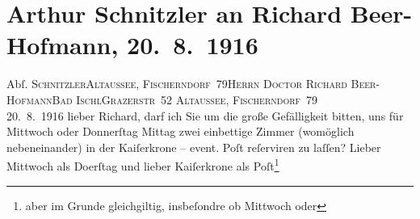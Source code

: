 

         
         \renewcommand{\erwaehntePersonen}{Personen: Richard Beer-Hofmann}
         \renewcommand{\erwaehnteOrte}{Orte: Altaussee, Aschau, Bad Aussee, Bad Ischl, Fischerndorf, Grazer Straße, Hoher Koppen, Hotel Kaiserkrone, Hotel Post, Pötschenpass, Restaurant Sonnenschein}
         \renewcommand{\erwaehnteWerke}{}
               \section[Arthur Schnitzler an Richard Beer-Hofmann, 20. 8. 1916]{ Arthur Schnitzler an Richard Beer-Hofmann, 20. 8. 1916}\nopagebreak{}\rehead{ }\begin{ledgroupsized}[t]{13cm}\normalsize\beginnumbering \toendnotes[C]{\smallbreak\pagebreak[2]} 
\pstart{}{\pb}Abſ. \textsc{Schnitzler}\pend{}\pstart{}\textsc{Altaussee, Fischerndorf 79}\pend{}{\bigskip}\pstart{}\textsc{Herrn Doctor Richard Beer-Hofmann}\pend{}\pstart{}\textsc{Bad Ischl}\pend{}\pstart{}\textsc{Grazerstr 52}\pend{}{\bigskip}\pstart
           \raggedleft{}{\pb}\textsc{Altaussee, Fischerndorf 79}{\\}20. 8. 1916\pend
           \pstart
           lieber Richard, darf ich Sie um die große Gefälligkeit bitten, uns
               für Mittwoch oder Donnerſtag{ }Mittag zwei einbettige Zimmer (womöglich nebeneinander) in der Kaiſerkrone – event. Poſt reſerviren zu laſſen? Lieber Mittwoch als
                     Do{\geminationn}erſtag und lieber Kaiſerkrone als Poſt\footnote{\noindent{}aber im Grunde gleichgiltig, insbeſondre ob Mittwoch oder
}
\end{ledgroupsized}
